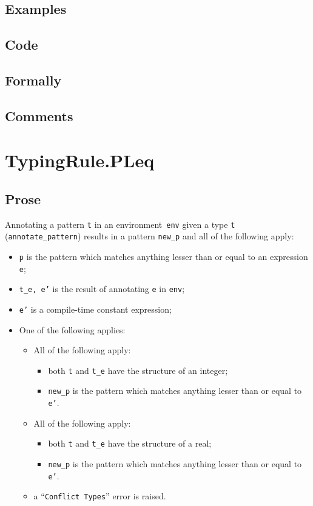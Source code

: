 \documentclass{book}
\begin{document}
  \subsection{Examples}

  \subsection{Code}

  \subsection{Formally}

  \subsection{Comments}

 \section{TypingRule.PLeq \label{sec:TypingRule.PLeq}}

  \subsection{Prose}
   Annotating a pattern \texttt{t} in an environment~\texttt{env} given a type \texttt{t} (\texttt{annotate\_pattern}) results in a pattern \texttt{new\_p} and all of the following apply:
   \begin{itemize}
   \item \texttt{p} is the pattern which matches anything lesser than or equal to an expression \texttt{e};
   \item \texttt{t\_e, e'} is the result of annotating \texttt{e} in \texttt{env}; 
   \item \texttt{e'} is a compile-time constant expression;
   \item One of the following applies:
     \begin{itemize}
     \item All of the following apply:
           \begin{itemize}
           \item both \texttt{t} and \texttt{t\_e} have the structure of an integer;
           \item \texttt{new\_p} is the pattern which matches anything lesser than or equal to \texttt{e'}.
           \end{itemize}
     \item All of the following apply:
           \begin{itemize}
           \item both \texttt{t} and \texttt{t\_e} have the structure of a real;
           \item \texttt{new\_p} is the pattern which matches anything lesser than or equal to \texttt{e'}.
           \end{itemize}
     \item a ``\texttt{Conflict Types}'' error is raised.
     \end{itemize}
   \end{itemize}
\end{document}
